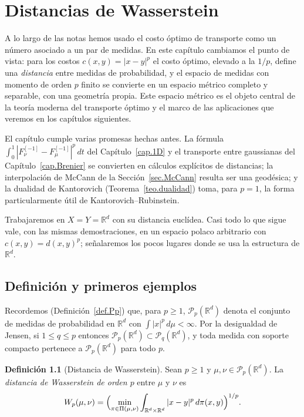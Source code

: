 \documentclass[12pt, a4paper]{amsbook}
\newcommand{\R}{{\mathbb R}}
\theoremstyle{remark}
\theoremstyle{definition}
\newtheorem{defi}[teo]{Definición}
\numberwithin{section}{chapter}
\numberwithin{subsection}{section}
\numberwithin{equation}{section}
\numberwithin{figure}{chapter}
\begin{document}
\chapter{Distancias de Wasserstein}\label{cap.Wp}

A lo largo de las notas hemos usado el costo óptimo de transporte como un
número asociado a un par de medidas. En este capítulo cambiamos el punto de
vista: para los costos $c(x,y)=|x-y|^p$ el costo óptimo, elevado a la $1/p$,
define una \emph{distancia} entre medidas de probabilidad, y el espacio de
medidas con momento de orden $p$ finito se convierte en un espacio métrico
completo y separable, con una geometría propia. Este espacio métrico es el
objeto central de la teoría moderna del transporte óptimo y el marco de las
aplicaciones que veremos en los capítulos siguientes.

El capítulo cumple varias promesas hechas antes. La fórmula
$\int_0^1|F_\nu^{[-1]}-F_\mu^{[-1]}|^p\,dt$ del Capítulo~\ref{cap.1D} y el
transporte entre gaussianas del Capítulo~\ref{cap.Brenier} se convierten en
cálculos explícitos de distancias; la interpolación de McCann de la
Sección~\ref{sec.McCann} resulta ser una geodésica; y la dualidad de
Kantorovich (Teorema~\ref{teo.dualidad}) toma, para $p=1$, la forma
particularmente útil de Kantorovich--Rubinstein.

Trabajaremos en $X=Y=\R^d$ con su distancia euclídea. Casi todo lo que sigue
vale, con las mismas demostraciones, en un espacio polaco arbitrario con
$c(x,y)=d(x,y)^p$; señalaremos los pocos lugares donde se usa la estructura de
$\R^d$.

\section{Definición y primeros ejemplos}\label{sec.Wp.def}

Recordemos (Definición~\ref{def.Pp}) que, para $p\ge1$, $\mathcal P_p(\R^d)$
denota el conjunto de medidas de probabilidad en $\R^d$ con
$\int|x|^p\,d\mu<\infty$. Por la desigualdad de Jensen, si $1\le q\le p$
entonces $\mathcal P_p(\R^d)\subset\mathcal P_q(\R^d)$, y toda medida con
soporte compacto pertenece a $\mathcal P_p(\R^d)$ para todo $p$.

\begin{defi}[Distancia de Wasserstein]\label{def.Wp}
Sean $p\ge1$ y $\mu,\nu\in\mathcal P_p(\R^d)$. La \emph{distancia de
Wasserstein de orden $p$} entre $\mu$ y $\nu$ es
\[
W_p(\mu,\nu)
=
\Bigl(\min_{\pi\in\Pi(\mu,\nu)}\int_{\R^d\times\R^d}|x-y|^p\,d\pi(x,y)\Bigr)^{1/p}.
\]
\end{defi}
\end{document}
